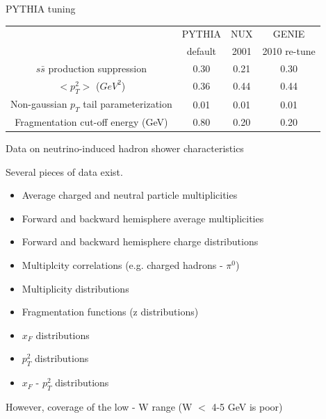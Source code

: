 \begin{frame}{PYTHIA tuning}

\begin{table}[ht]
\centering
\begin{tabular}{| c || c | c | c |}
\hline
                                              &  PYTHIA    & NUX   & GENIE \\
                                              &  default   & 2001  & 2010 re-tune \\
\hline
  $s\bar{s}$ production suppression           &    0.30    & 0.21        & 0.30      \\
  $<p_{T}^{2}>$ ($GeV^{2}$)                   &    0.36    & 0.44        & 0.44      \\
  Non-gaussian $p_{T}$ tail parameterization  &    0.01    & 0.01        & 0.01      \\
  Fragmentation cut-off energy (GeV)          &    0.80    & 0.20        & 0.20      \\
\hline
\end{tabular}
\end{table}
\end{frame}


\begin{frame}{Data on neutrino-induced hadron shower characteristics}

Several pieces of data exist.\\
\vspace{0.3cm}
\begin{itemize}
  \item Average charged and neutral particle multiplicities
  \item Forward and backward hemisphere average multiplicities
  \item Forward and backward hemisphere charge distributions
  \item Multiplcity correlations (e.g. charged hadrons - $\pi^{0}$)
  \item Multiplicity distributions
  \item Fragmentation functions (z distributions)
  \item $x_{F}$ distributions
  \item $p_{T}^{2}$ distributions
  \item $x_{F}$ - $p_{T}^{2}$ distributions
\end{itemize}

However, coverage of the low - W range (W $<$ 4-5 GeV is poor)

\end{frame}


